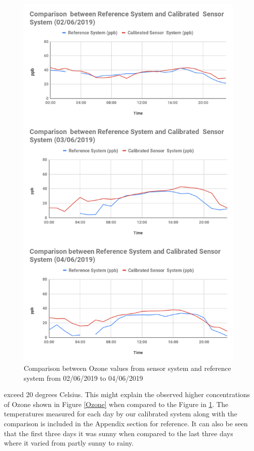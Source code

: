 \begin{figure}[h]
  \begin{center}
  \includegraphics[scale=0.46]{images/figure84oz.png}
  \end{center}
  \caption{Comparison between Ozone values from sensor system and reference system from 02/06/2019 to 04/06/2019}
  \label{Ozone1}
  \hspace{1 cm}
\end{figure}
\clearpage

exceed 20 degrees Celsius. This might explain the observed higher concentrations of Ozone shown in Figure \ref{Ozone} when compared to the Figure in \ref{Ozone1}. The temperatures measured for each day by our calibrated system along with the comparison is included in the Appendix section for reference. It can also be seen that the first three days it was sunny when compared to the last three days where it varied from partly sunny to rainy. 



